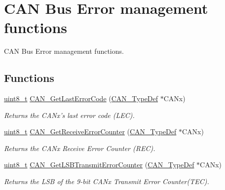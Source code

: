 \hypertarget{group___c_a_n___group5}{\section{C\-A\-N Bus Error management functions}
\label{group___c_a_n___group5}
}


C\-A\-N Bus Error management functions.  


\subsection*{Functions}
\begin{DoxyCompactItemize}
\item 
\hyperlink{stdint_8h_aba7bc1797add20fe3efdf37ced1182c5}{uint8\-\_\-t} \hyperlink{group___c_a_n___group5_gaaee721a392b6b21bfd15dc160aeb6924}{C\-A\-N\-\_\-\-Get\-Last\-Error\-Code} (\hyperlink{struct_c_a_n___type_def}{C\-A\-N\-\_\-\-Type\-Def} $\ast$C\-A\-Nx)
\begin{DoxyCompactList}\small\item\em Returns the C\-A\-Nx's last error code (L\-E\-C). \end{DoxyCompactList}\item 
\hyperlink{stdint_8h_aba7bc1797add20fe3efdf37ced1182c5}{uint8\-\_\-t} \hyperlink{group___c_a_n___group5_ga6903eecbec40eb1361d915ddde9a3274}{C\-A\-N\-\_\-\-Get\-Receive\-Error\-Counter} (\hyperlink{struct_c_a_n___type_def}{C\-A\-N\-\_\-\-Type\-Def} $\ast$C\-A\-Nx)
\begin{DoxyCompactList}\small\item\em Returns the C\-A\-Nx Receive Error Counter (R\-E\-C). \end{DoxyCompactList}\item 
\hyperlink{stdint_8h_aba7bc1797add20fe3efdf37ced1182c5}{uint8\-\_\-t} \hyperlink{group___c_a_n___group5_ga85ee0c35bf7ca15d4e4c862eef534843}{C\-A\-N\-\_\-\-Get\-L\-S\-B\-Transmit\-Error\-Counter} (\hyperlink{struct_c_a_n___type_def}{C\-A\-N\-\_\-\-Type\-Def} $\ast$C\-A\-Nx)
\begin{DoxyCompactList}\small\item\em Returns the L\-S\-B of the 9-\/bit C\-A\-Nx Transmit Error Counter(\-T\-E\-C). \end{DoxyCompactList}\end{DoxyCompactItemize}


